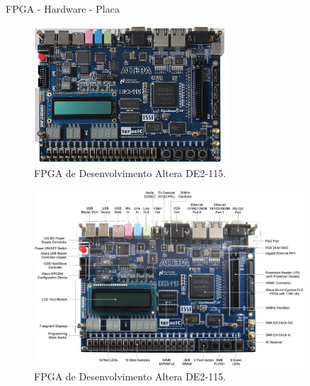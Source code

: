 	\begin{frame}{FPGA - Hardware - Placa}
        \vspace{-1em}
		\begin{figure}[p]
			\centering
			\includegraphics[width=0.64\textwidth]{img/fpga/terasic_placa.jpg}
			\caption{FPGA de Desenvolvimento Altera DE2-115.}
			\label{fig:terasic_placa}
		\end{figure}
	\end{frame}

	\begin{frame}%
		\begin{figure}[p]
			\centering
			\includegraphics[width=0.9\textwidth]{img/fpga/terasic_placa_detalhado.jpg}
			\caption{FPGA de Desenvolvimento Altera DE2-115.}
			\label{fig:terasic_placa2}
		\end{figure}
	\end{frame}




